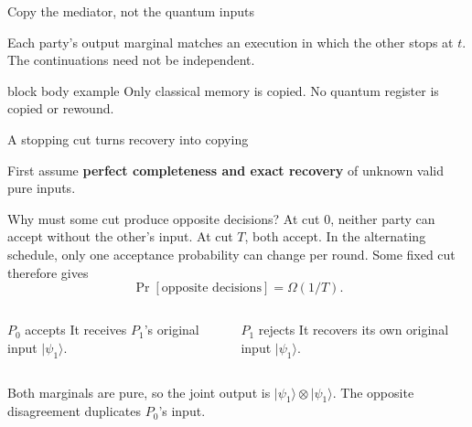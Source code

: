 \documentclass[aspectratio=169,11pt]{beamer}
\begin{document}
\begin{frame}{Copy the mediator, not the quantum inputs}
\begin{center}
\end{center}

Each party's output marginal matches an execution in which the other stops at $t$.
The continuations need not be independent.

\medskip
\begin{beamercolorbox}[
    wd=\linewidth,
    sep=0.8ex,
    rounded=true,
    center
]{block body example}
Only classical memory is copied.
No quantum register is copied or rewound.
\end{beamercolorbox}
\end{frame}


\begin{frame}{A stopping cut turns recovery into copying}
\small
\setlength{\parskip}{0pt}
\setlength{\abovedisplayskip}{4pt}
\setlength{\belowdisplayskip}{4pt}

First assume \textbf{perfect completeness and exact recovery} of unknown valid pure inputs.

\begin{block}{Why must some cut produce opposite decisions?}
At cut $0$, neither party can accept without the other's input.
At cut $T$, both accept.
In the alternating schedule, only one acceptance probability can change per round.
Some fixed cut therefore gives
$$
    \Pr[\text{opposite decisions}] = \Omega(1/T).
$$
\end{block}

\smallskip
\begin{columns}[T,onlytextwidth]
    \begin{exampleblock}{$P_0$ accepts}
        It receives $P_1$'s original input $\lvert\psi_1\rangle$.
    \end{exampleblock}

    \begin{block}{$P_1$ rejects}
        It recovers its own original input $\lvert\psi_1\rangle$.
    \end{block}
\end{columns}

\medskip
\centering
Both marginals are pure, so the joint output is $\lvert\psi_1\rangle\otimes\lvert\psi_1\rangle$.
The opposite disagreement duplicates $P_0$'s input.
\end{frame}
\end{document}
